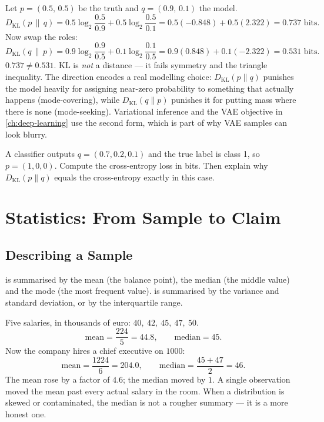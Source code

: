 \begin{workedexample}
Let $p = (0.5,\,0.5)$ be the truth and $q = (0.9,\,0.1)$ the model.
\[
  D_{\mathrm{KL}}(p\,\|\,q)
  = 0.5\log_2\frac{0.5}{0.9} + 0.5\log_2\frac{0.5}{0.1}
  = 0.5(-0.848) + 0.5(2.322)
  = 0.737 \text{ bits.}
\]
Now swap the roles:
\[
  D_{\mathrm{KL}}(q\,\|\,p)
  = 0.9\log_2\frac{0.9}{0.5} + 0.1\log_2\frac{0.1}{0.5}
  = 0.9(0.848) + 0.1(-2.322)
  = 0.531 \text{ bits.}
\]
$0.737 \neq 0.531$. KL is \emph{not} a distance --- it fails symmetry and the
triangle inequality. The direction encodes a real modelling choice:
$D_{\mathrm{KL}}(p\|q)$ punishes the model heavily for assigning near-zero
probability to something that actually happens (mode-covering), while
$D_{\mathrm{KL}}(q\|p)$ punishes it for putting mass where there is none
(mode-seeking). Variational inference and the VAE objective in
\cref{ch:deep-learning} use the second form, which is part of why VAE samples
can look blurry.
\end{workedexample}

\begin{checkpoint}
A classifier outputs $q = (0.7, 0.2, 0.1)$ and the true label is class 1, so
$p = (1,0,0)$. Compute the cross-entropy loss in bits. Then explain why
$D_{\mathrm{KL}}(p\|q)$ equals the cross-entropy exactly in this case.
\end{checkpoint}

\section{Statistics: From Sample to Claim}

\subsection{Describing a Sample}

 is summarised by the mean (the balance point), the
median (the middle value) and the mode (the most frequent value).
 is summarised by the variance and standard deviation, or by
the interquartile range.

\begin{workedexample}
Five salaries, in thousands of euro: $40,\ 42,\ 45,\ 47,\ 50$.
\[
  \text{mean} = \frac{224}{5} = 44.8,
  \qquad \text{median} = 45 .
\]
Now the company hires a chief executive on $1000$:
\[
  \text{mean} = \frac{1224}{6} = 204.0,
  \qquad \text{median} = \frac{45+47}{2} = 46 .
\]
The mean rose by a factor of $4.6$; the median moved by $1$. A single
observation moved the mean past every actual salary in the room. When a
distribution is skewed or contaminated, the median is not a rougher summary ---
it is a more honest one.
\end{workedexample}

